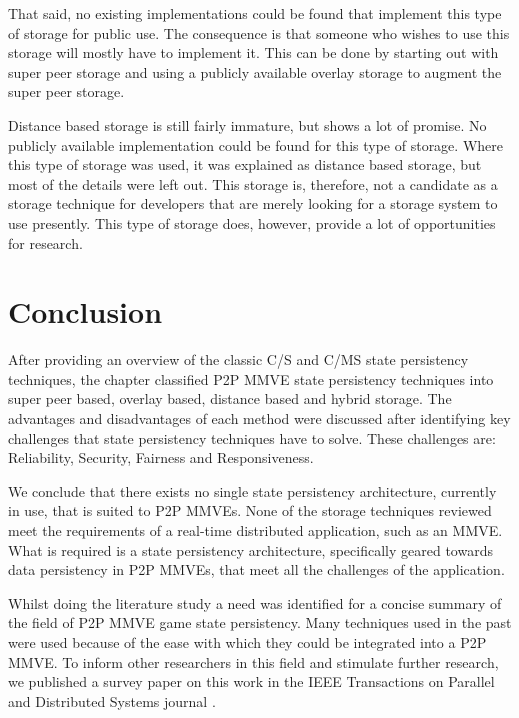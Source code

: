 That said, no existing implementations could be found that implement this type of storage for public use. The consequence is that someone who wishes
to use this storage will mostly have to implement it. This can be done by starting out with super peer storage and using a publicly available overlay
storage to augment the super peer storage.

Distance based storage is still fairly immature, but shows a lot of promise. No publicly available implementation could be found for this type of
storage. Where this type of storage was used, it was explained as distance based storage, but most of the details were left out. This storage is,
therefore, not a candidate as a storage technique for developers that are merely looking for a storage system to use presently. This type of storage
does, however, provide a lot of opportunities for research.

\section{Conclusion}
\label{conclusion}

After providing an overview of the classic C/S and C/MS state persistency techniques, the chapter classified P2P MMVE state persistency techniques
into super peer based, overlay based, distance based and hybrid storage. The advantages and disadvantages of each method were discussed after
identifying key challenges that state persistency techniques have to solve. These challenges are: Reliability, Security, Fairness and Responsiveness.

We conclude that there exists no single state persistency architecture, currently in use, that is suited to P2P MMVEs. None of the storage techniques reviewed meet the requirements of a real-time distributed application, such as an MMVE. What is required is a state persistency architecture, specifically geared towards data persistency in P2P MMVEs, that meet all the challenges of the application.

Whilst doing the literature study a need was identified for a concise summary of the field of P2P MMVE game state persistency. Many techniques used in the past were used because of the ease with which they could be integrated into a P2P MMVE. To inform other researchers in this field and stimulate further research, we published a survey paper on this work in the IEEE Transactions on Parallel and Distributed Systems journal \cite{gilmore_p2p_mmog_state_persistency}.
